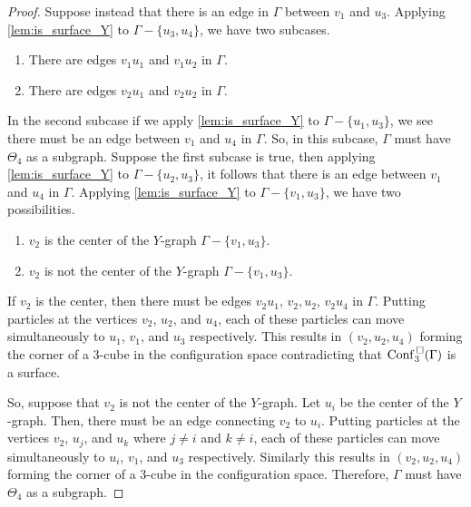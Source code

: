 \begin{proof}
    Suppose instead that there is an edge in \(\Gamma\) between \(v_1\) and \(u_3\).
    Applying \ref{lem:is_surface_Y} to \(\Gamma - \{u_3, u_4\}\),
    we have two subcases.
    \begin{enumerate}
        \item There are edges \(v_1 u_1\) and \(v_1 u_2\) in \(\Gamma\).
        \item There are edges \(v_2 u_1\) and \(v_2 u_2\) in \(\Gamma\).
    \end{enumerate}
    In the second subcase if we apply \ref{lem:is_surface_Y} to \(\Gamma - \{u_1, u_3\}\),
    we see there must be an edge between \(v_1\) and \(u_4\) in \(\Gamma\).
    So, in this subcase, \(\Gamma\) must have \(\Theta_4\) as a subgraph.
    Suppose the first subcase is true, then applying \ref{lem:is_surface_Y} to \(\Gamma - \{u_2, u_3\}\),
    it follows that there is an edge between \(v_1\) and \(u_4\) in \(\Gamma\).
    Applying \ref{lem:is_surface_Y} to \(\Gamma - \{v_1, u_3\}\),
    we have two possibilities.
    \begin{enumerate}
        \item \(v_2\) is the center of the \(Y\)-graph \(\Gamma - \{v_1, u_3\}\).
        \item \(v_2\) is not the center of the \(Y\)-graph \(\Gamma - \{v_1, u_3\}\).
    \end{enumerate}
    If \(v_2\) is the center, then there must be edges \(v_2 u_1\), \(v_2, u_2\), \(v_2 u_4\) in \(\Gamma\).
    Putting particles at the vertices \(v_2\), \(u_2\), and \(u_4\), each of these particles can move
    simultaneously to \(u_1\), \(v_1\), and \(u_3\) respectively.
    This results in \((v_2, u_2, u_4)\) forming the corner of a \(3\)-cube in the configuration space
    contradicting that \(\mathrm{Conf}^{\,\square}_3(\Gamma)\) is a surface.

    So, suppose that \(v_2\) is not the center of the \(Y\)-graph. Let \(u_i\) be the center of the \(Y\)-graph.
    Then, there must be an edge connecting \(v_2\) to \(u_i\).
    Putting particles at the vertices \(v_2\), \(u_j\), and \(u_k\) where \(j \neq i\) and \(k \neq i\),
    each of these particles can move simultaneously to \(u_i\), \(v_1\), and \(u_3\) respectively.
    Similarly this results in \((v_2, u_2, u_4)\) forming the corner of a \(3\)-cube in the configuration space.
    Therefore, \(\Gamma\) must have \(\Theta_4\) as a subgraph.


\end{proof}
